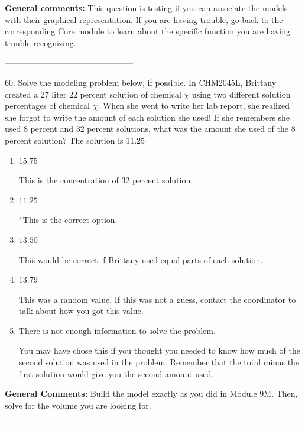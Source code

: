 \documentclass{extbook}[14pt]
\begin{document}
\textbf{General comments:} This question is testing if you can associate the models with their graphical representation. If you are having trouble, go back to the corresponding Core module to learn about the specific function you are having trouble recognizing.

-----------------------------------------------

60. Solve the modeling problem below, if possible.
In CHM2045L, Brittany created a 27 liter 22 percent solution of chemical $\chi$ using two different solution percentages of chemical $\chi$. When she went to write her lab report, she realized she forgot to write the amount of each solution she used! If she remembers she used 8 percent and 32 percent solutions, what was the amount she used of the 8 percent solution? 
The solution is $ 11.25 $ 

\begin{enumerate}[label=\Alph*.] 
\item $ 15.75 $ 

 This is the concentration of 32 percent solution. 
\item $ 11.25 $ 

 *This is the correct option. 
\item $ 13.50 $ 

 This would be correct if Brittany used equal parts of each solution. 
\item $ 13.79 $ 

 This was a random value. If this was not a guess, contact the coordinator to talk about how you got this value. 
\item $ \text{There is not enough information to solve the problem.} $ 

 You may have chose this if you thought you needed to know how much of the second solution was used in the problem. Remember that the total minus the first solution would give you the second amount used. 
\end{enumerate} 
 
\textbf{General Comments:} Build the model exactly as you did in Module 9M. Then, solve for the volume you are looking for.

-----------------------------------------------
\end{document}
